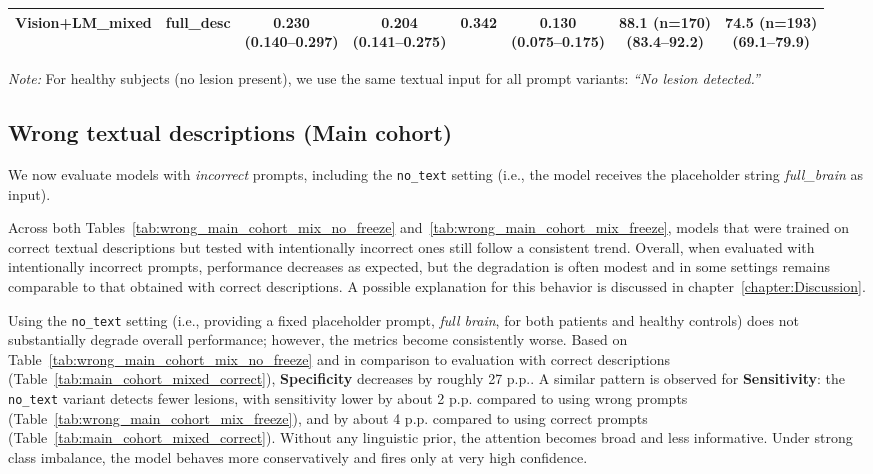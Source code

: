 \documentclass[FCD_GNN.tex]{subfiles}
\begin{document}
\begin{table}[H]
\begin{tabular}{lccccccc}
\hline
Vision+LM\_mixed & 
full\_desc &
\makecell{\colorbox{orange!15}{0.230} \\ (0.140--0.297)} &
\makecell{0.204 \\ (0.141--0.275)} &
0.342 &
\makecell{\colorbox{orange!15}{0.130} \\ (0.075--0.175)} &
\makecell{88.1 (n=170) \\ (83.4--92.2)} &
\makecell{\colorbox{green!15}{74.5 (n=193)} \\ (69.1--79.9)} \\
\hline
\end{tabular}
\vspace{2mm}
\par\noindent\centering
\parbox{0.95\linewidth}{\footnotesize\textit{Note:} For healthy subjects (no lesion present), we use the same textual input for all prompt variants: \textit{``No lesion detected.''}}
\end{table}

\subsection*{Wrong textual descriptions (Main cohort)}
We now evaluate models with \emph{incorrect} prompts, including the \texttt{no\_text} setting (i.e., the model receives the placeholder string \textit{full\_brain} as input).

Across both Tables~\ref{tab:wrong_main_cohort_mix_no_freeze} and~\ref{tab:wrong_main_cohort_mix_freeze}, models that were trained on correct 
textual descriptions but tested with intentionally incorrect ones still follow a consistent trend. 
Overall, when evaluated with intentionally incorrect prompts, performance decreases as expected, but the degradation is often modest and in some settings remains comparable to that obtained with correct descriptions.
A possible explanation for this behavior is discussed in chapter~\ref{chapter:Discussion}.

Using the \texttt{no\_text} setting (i.e., providing a fixed placeholder prompt, \textit{full brain}, 
for both patients and healthy controls) does not substantially degrade overall performance; 
however, the metrics become consistently worse.
Based on Table~\ref{tab:wrong_main_cohort_mix_no_freeze} and in comparison to evaluation with correct descriptions 
(Table~\ref{tab:main_cohort_mixed_correct}), \textbf{Specificity} decreases by roughly 27 \ac{p.p.}.
A similar pattern is observed for \textbf{Sensitivity}: the \texttt{no\_text} variant detects fewer lesions, 
with sensitivity lower by about 2 \ac{p.p.} compared to using wrong prompts 
(Table~\ref{tab:wrong_main_cohort_mix_freeze}), and by about 4 \ac{p.p.} compared to using correct prompts 
(Table~\ref{tab:main_cohort_mixed_correct}). Without any linguistic prior, the attention becomes broad and less informative. 
Under strong class imbalance, the model behaves more conservatively and fires only at very high confidence.
\end{document}
